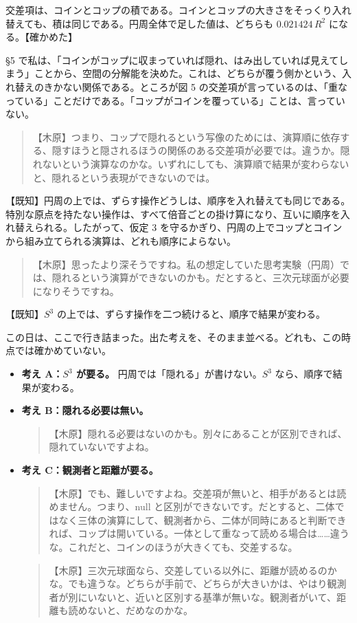 \documentclass[
  a4paper,
]{ltjsarticle}
\begin{document}
交差項は、コインとコップの積である。コインとコップの大きさをそっくり入れ替えても、積は同じである。円周全体で足した値は、どちらも
\(0.021424\,R^2\) になる。【確かめた】

§5
で私は、「コインがコップに収まっていれば隠れ、はみ出していれば見えてしまう」ことから、空間の分解能を決めた。これは、どちらが覆う側かという、入れ替えのきかない関係である。ところが図
5
の交差項が言っているのは、「重なっている」ことだけである。「コップがコインを覆っている」ことは、言っていない。

\begin{quote}
【木原】つまり、コップで隠れるという写像のためには、演算順に依存する、隠すほうと隠されるほうの関係のある交差項が必要では。違うか。隠れないという演算なのかな。いずれにしても、演算順で結果が変わらないと、隠れるという表現ができないのでは。
\end{quote}

【既知】円周の上では、ずらす操作どうしは、順序を入れ替えても同じである。特別な原点を持たない操作は、すべて倍音ごとの掛け算になり、互いに順序を入れ替えられる。したがって、仮定
3
を守るかぎり、円周の上でコップとコインから組み立てられる演算は、どれも順序によらない。

\begin{quote}
【木原】思ったより深そうですね。私の想定していた思考実験（円周）では、隠れるという演算ができないのかも。だとすると、三次元球面が必要になりそうですね。
\end{quote}

【既知】\(S^3\) の上では、ずらす操作を二つ続けると、順序で結果が変わる。

この日は、ここで行き詰まった。出た考えを、そのまま並べる。どれも、この時点では確かめていない。

\begin{itemize}
\item
  \textbf{考え A：\(S^3\) が要る。}
  円周では「隠れる」が書けない。\(S^3\) なら、順序で結果が変わる。
\item
  \textbf{考え B：隠れる必要は無い。}

  \begin{quote}
  【木原】隠れる必要はないのかも。別々にあることが区別できれば、隠れていないですよね。
  \end{quote}
\item
  \textbf{考え C：観測者と距離が要る。}

  \begin{quote}
  【木原】でも、難しいですよね。交差項が無いと、相手があるとは読めません。つまり、null
  と区別ができないです。だとすると、二体ではなく三体の演算にして、観測者から、二体が同時にあると判断できれば、コップは開いている。一体として重なって読める場合は\ldots\ldots 違うな。これだと、コインのほうが大きくても、交差するな。
  \end{quote}

  \begin{quote}
  【木原】三次元球面なら、交差している以外に、距離が読めるのかな。でも違うな。どちらが手前で、どちらが大きいかは、やはり観測者が別にいないと、近いと区別する基準が無いな。観測者がいて、距離も読めないと、だめなのかな。
  \end{quote}
\end{itemize}
\end{document}
